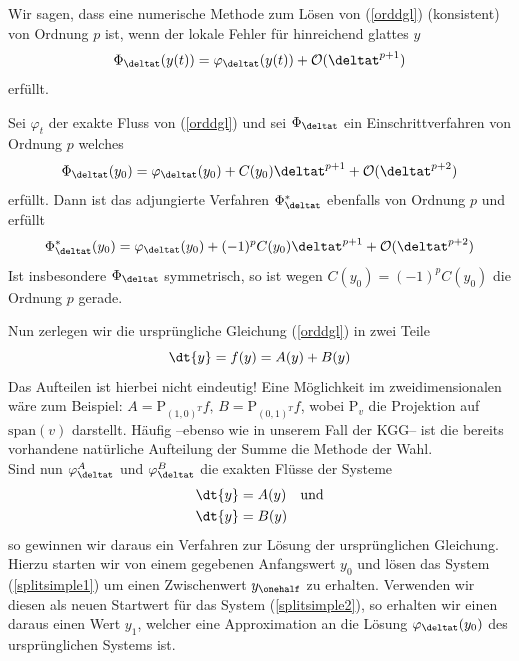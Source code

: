 \begin{mathdef}[Konsistenzordnung]
Wir sagen, dass eine numerische Methode zum Lösen von (\ref{orddgl}) (konsistent) von Ordnung $p$ ist, wenn der lokale Fehler für hinreichend glattes $y$
\[\Phi_{\deltat}(y(t))=\varphi_{\deltat}(y(t))+\mathcal{O}(\deltat^{p+1})\] erfüllt.
\end{mathdef}
\begin{maththeorem}
\label{adjfloworder}
Sei $\varphi_t$ der exakte Fluss von (\ref{orddgl}) und sei $\Phi_{\deltat}$ ein Einschrittverfahren von Ordnung $p$ welches 
\[\Phi_{\deltat}(y_0)=\varphi_{\deltat}(y_0)+C(y_0)\deltat^{p+1}+\mathcal{O}(\deltat^{p+2})\]
erfüllt. Dann ist das adjungierte Verfahren $\Phi_{\deltat}^*$ ebenfalls von Ordnung $p$ und erfüllt
\[\Phi_{\deltat}^*(y_0)=\varphi_{\deltat}(y_0)+(-1)^{p}C(y_0)\deltat^{p+1}+\mathcal{O}(\deltat^{p+2})\]
Ist insbesondere $\Phi_{\deltat}$ symmetrisch, so ist wegen $C(y_0)=(-1)^pC(y_0)$ die Ordnung $p$ gerade.
\end{maththeorem}
Nun zerlegen wir die ursprüngliche Gleichung (\ref{orddgl}) in zwei Teile
\[\dt{y}=f(y)=A(y)+B(y) \]
Das Aufteilen ist hierbei nicht eindeutig! Eine Möglichkeit im zweidimensionalen wäre zum Beispiel: $A=\text{P}_{(1,0)^T}f,\,B=\text{P}_{(0,1)^T}f$, wobei $\text{P}_v$ die Projektion auf $\text{span}(v)$ darstellt. Häufig --ebenso wie in unserem Fall der KGG-- ist die bereits vorhandene natürliche Aufteilung der Summe die Methode der Wahl.\\
Sind nun $\varphi_{\deltat}^A$ und $\varphi_{\deltat}^B$ die exakten Flüsse der Systeme
\begin{align}
\dt{y}&=A(y)\quad \text{und} \label{splitsimple1}\\ 
\dt{y}&=B(y) \label{splitsimple2}
\end{align}
so gewinnen wir daraus ein Verfahren zur Lösung der ursprünglichen Gleichung.\\
Hierzu starten wir von einem gegebenen Anfangswert $y_0$ und lösen das System (\ref{splitsimple1}) um einen Zwischenwert $y_{\onehalf}$ zu erhalten. Verwenden wir diesen als neuen Startwert für das System (\ref{splitsimple2}), so erhalten wir einen daraus einen Wert $y_1$, welcher eine Approximation an die Lösung $\varphi_{\deltat}(y_0)$ des ursprünglichen Systems ist.\\[1cm]
\noindent\begin{minipage}{0.3\textwidth}


\end{minipage}%
